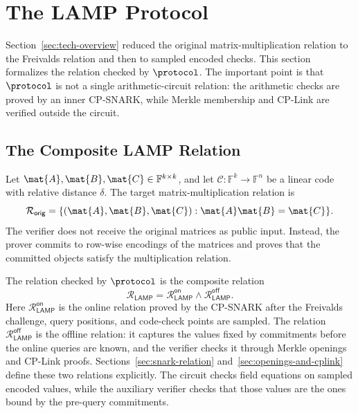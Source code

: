 \section{The LAMP Protocol}
\label{sec:construction}

Section~\ref{sec:tech-overview} reduced the original matrix-multiplication
relation to the Freivalds relation and then to sampled encoded checks.  This
section formalizes the relation checked by \(\protocol\).  The important point is
that \(\protocol\) is not a single arithmetic-circuit relation: the arithmetic
checks are proved by an inner CP-SNARK, while Merkle membership and CP-Link are
verified outside the circuit.

\subsection{The Composite LAMP Relation}
\label{sec:relation-chain}

Let \(\mat{A},\mat{B},\mat{C}\in\mathbb{F}^{k\times k}\), and let
\(\mathcal{C}:\mathbb{F}^k\to\mathbb{F}^n\) be a linear code with
relative distance \(\delta\).  The target matrix-multiplication relation is
\[
  \mathcal{R}_{\mathsf{orig}}
  =
  \{(\mat{A},\mat{B},\mat{C}) :
    \mat{A}\mat{B}=\mat{C}\}.
\]
The verifier does not receive the original matrices as public input.  Instead, the
prover commits to row-wise encodings of the matrices and proves that the
committed objects satisfy the multiplication relation.

The relation checked by \(\protocol\) is the composite relation
\[
  \mathcal{R}_{\mathsf{LAMP}}
  =
  \mathcal{R}_{\mathsf{LAMP}}^{\mathsf{on}}
  \land
  \mathcal{R}_{\mathsf{LAMP}}^{\mathsf{off}} .
\]
Here \(\mathcal{R}_{\mathsf{LAMP}}^{\mathsf{on}}\) is the online relation proved by the CP-SNARK after the Freivalds challenge, query positions, and code-check points are sampled.  The relation \(\mathcal{R}_{\mathsf{LAMP}}^{\mathsf{off}}\) is the offline relation: it captures the values fixed by commitments before the online queries are known, and the verifier checks it through Merkle openings and CP-Link proofs.
Sections~\ref{sec:snark-relation} and~\ref{sec:openings-and-cplink} define
these two relations explicitly.
The circuit checks field equations on sampled encoded values, while the auxiliary verifier checks that those values are the ones bound by the pre-query commitments.


